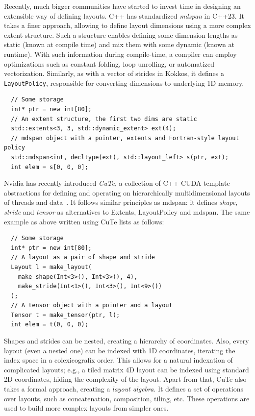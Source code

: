 Recently, much bigger communities have started to invest time in designing an extensible way of defining layouts. C++ has standardized \emph{mdspan} in C++23. It takes a finer approach, allowing to define layout dimensions using a more complex extent structure. Such a structure enables defining some dimension lengths as static (known at compile time) and mix them with some dynamic (known at runtime). With such information during compile-time, a compiler can employ optimizations such as constant folding, loop unrolling, or automatized vectorization. Similarly, as with a vector of strides in Kokkos, it defines a \texttt{LayoutPolicy}, responsible for converting dimensions to underlying 1D memory. 

\begin{verbatim}
  // Some storage
  int* ptr = new int[80];
  // An extent structure, the first two dims are static 
  std::extents<3, 3, std::dynamic_extent> ext(4);
  // mdspan object with a pointer, extents and Fortran-style layout policy
  std::mdspan<int, decltype(ext), std::layout_left> s(ptr, ext);
  int elem = s[0, 0, 0];
\end{verbatim}

Nvidia has recently introduced \emph{CuTe}, a collection of C++ CUDA template abstractions for defining and operating on hierarchically multidimensional layouts of threads and data~\cite{cute-online}. It follows similar principles as mdspan: it defines \emph{shape}, \emph{stride} and \emph{tensor} as alternatives to Extents, LayoutPolicy and mdspan. The same example as above written using CuTe lists as follows:

\begin{verbatim}
  // Some storage
  int* ptr = new int[80];
  // A layout as a pair of shape and stride
  Layout l = make_layout(
    make_shape(Int<3>(), Int<3>(), 4),
    make_stride(Int<1>(), Int<3>(), Int<9>())
  );
  // A tensor object with a pointer and a layout
  Tensor t = make_tensor(ptr, l);
  int elem = t(0, 0, 0);
\end{verbatim}

Shapes and strides can be nested, creating a hierarchy of coordinates. Also, every layout (even a nested one) can be indexed with 1D coordinates, iterating the index space in a colexicografix order. This allows for a natural indexation of complicated layouts; e.g., a tiled matrix 4D layout can be indexed using standard 2D coordinates, hiding the complexity of the layout. 
Apart from that, CuTe also takes a formal approach, creating a \emph{layout algebra}. It defines a set of operations over layouts, such as concatenation, composition, tiling, etc. These operations are used to build more complex layouts from simpler ones.

